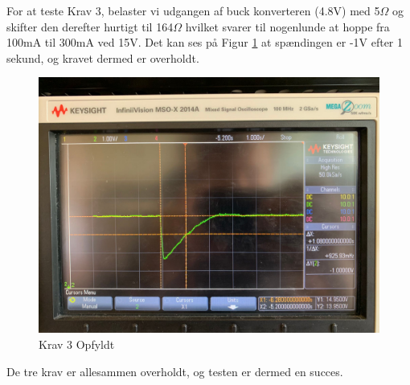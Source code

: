 \documentclass[../main.tex]{subfiles}
\begin{document}
For at teste Krav 3, belaster vi udgangen af buck konverteren (4.8V) med 5$\Omega$ og skifter den derefter hurtigt til 164$\Omega$ hvilket svarer til nogenlunde at hoppe fra 100mA til 300mA ved 15V. Det kan ses på Figur \ref{fig: Krav 3 Opfyldt} at spændingen er -1V efter 1 sekund, og kravet dermed er overholdt.
\begin{figure}[H]
      \includegraphics[width=\textwidth]{Dokumentation/Pictures/Krav3.jpg}
     \caption{Krav 3 Opfyldt}
     \label{fig: Krav 3 Opfyldt}
\end{figure}

De tre krav er allesammen overholdt, og testen er dermed en succes. 

     
\end{document}
